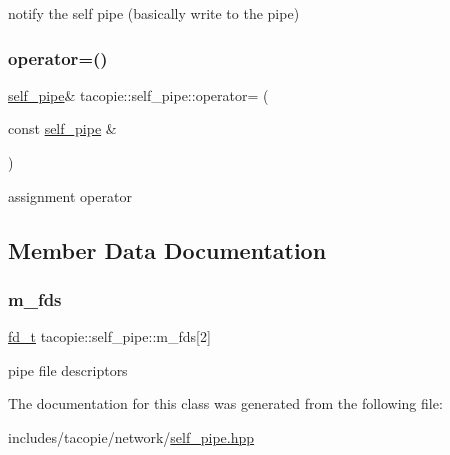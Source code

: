 notify the self pipe (basically write to the pipe) \mbox{\label{classtacopie_1_1self__pipe_a14e0fa3a880b6c9559c087eac480c518}} 
\subsubsection{\texorpdfstring{operator=()}{operator=()}}
{\footnotesize\ttfamily \hyperlink{classtacopie_1_1self__pipe}{self\+\_\+pipe}\& tacopie\+::self\+\_\+pipe\+::operator= (\begin{DoxyParamCaption}\item[{const \hyperlink{classtacopie_1_1self__pipe}{self\+\_\+pipe} \&}]{ }\end{DoxyParamCaption})\hspace{0.3cm}{\ttfamily [delete]}}



assignment operator 



\subsection{Member Data Documentation}
\mbox{\label{classtacopie_1_1self__pipe_a3e562cfb5ffdd3a8bc6a7c28eca2b7af}} 
\subsubsection{\texorpdfstring{m\+\_\+fds}{m\_fds}}
{\footnotesize\ttfamily \hyperlink{namespacetacopie_acce7ad26b2d30156b1e6fa353f727026}{fd\+\_\+t} tacopie\+::self\+\_\+pipe\+::m\+\_\+fds\mbox{[}2\mbox{]}\hspace{0.3cm}{\ttfamily [private]}}

pipe file descriptors 

The documentation for this class was generated from the following file\+:\begin{DoxyCompactItemize}
\item 
includes/tacopie/network/\hyperlink{self__pipe_8hpp}{self\+\_\+pipe.\+hpp}\end{DoxyCompactItemize}
